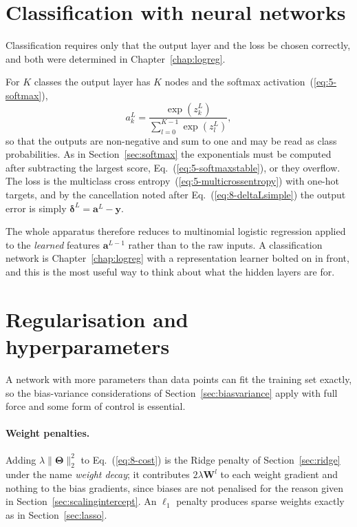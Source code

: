 \section{Classification with neural networks}
\label{sec:nnclassification}

Classification requires only that the output layer and the loss be chosen
correctly, and both were determined in Chapter~\ref{chap:logreg}.

For $K$ classes the output layer has $K$ nodes and the softmax
activation~(\ref{eq:5-softmax}),
\begin{equation}
  a_k^{L} = \frac{\exp\left(z_k^{L}\right)}
                 {\sum_{l=0}^{K-1}\exp\left(z_l^{L}\right)},
  \label{eq:8-softmax}
\end{equation}
so that the outputs are non-negative and sum to one and may be read as class
probabilities.  As in Section~\ref{sec:softmax} the exponentials must be
computed after subtracting the largest score, Eq.~(\ref{eq:5-softmaxstable}),
or they overflow.  The loss is the multiclass cross
entropy~(\ref{eq:5-multicrossentropy}) with one-hot targets, and by the
cancellation noted after Eq.~(\ref{eq:8-deltaLsimple}) the output error is
simply $\bm{\delta}^{L}=\bm{a}^{L}-\bm{y}$.

The whole apparatus therefore reduces to multinomial logistic regression
applied to the \emph{learned} features $\bm{a}^{L-1}$ rather than to the raw
inputs.  A classification network is Chapter~\ref{chap:logreg} with a
representation learner bolted on in front, and this is the most useful way to
think about what the hidden layers are for.

\section{Regularisation and hyperparameters}
\label{sec:nnregularisation}

A network with more parameters than data points can fit the training set
exactly, so the bias-variance considerations of
Section~\ref{sec:biasvariance} apply with full force and some form of control
is essential.

\paragraph{Weight penalties.}
Adding $\lambda\|\bm{\Theta}\|_2^{2}$ to Eq.~(\ref{eq:8-cost}) is the Ridge
penalty of Section~\ref{sec:ridge} under the name \emph{weight decay}; it
contributes $2\lambda\bm{W}^{l}$ to each weight gradient and nothing to the
bias gradients, since biases are not penalised for the reason given in
Section~\ref{sec:scalingintercept}.  An $\ell_1$ penalty produces sparse
weights exactly as in Section~\ref{sec:lasso}.

